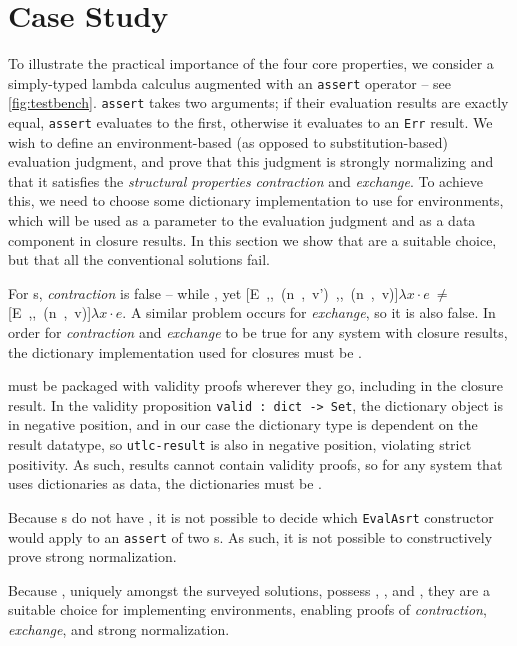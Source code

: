 \section{Case Study}
\label{sec:CaseStudy}



To illustrate the practical importance of the four core properties, we consider a simply-typed lambda calculus
augmented with an \texttt{assert} operator -- see \autoref{fig:testbench}.
\texttt{assert} takes two arguments; if their evaluation results are exactly equal, \texttt{assert} evaluates to the first,
otherwise it evaluates to an \texttt{Err} result. We wish to define an environment-based (as opposed to substitution-based)
evaluation judgment, and prove that this judgment is strongly normalizing and that it  satisfies the
\emph{structural properties} \emph{contraction} and \emph{exchange}. To achieve this,
we need to choose some dictionary implementation to use for environments,
which will be used as a parameter to the evaluation judgment and as a data component in closure results.
In this section we show that \dds{} are a suitable choice, but that all the conventional solutions fail.

For \sal{}s, \emph{contraction} is false --
while , yet
\hbox{[E ,, (n , v') ,, (n , v)]$\lambda x \cdot e$}$~\ne~$\hbox{[E ,, (n , v)]$\lambda x \cdot e$}.
A similar problem occurs for \emph{exchange}, so it is also false.
In order for \emph{contraction} and \emph{exchange} to be true for any system with closure results,
the dictionary implementation used for closures must be \extensional.

\Cals{} must be packaged with validity proofs wherever they go, including in the closure result.
In the validity proposition \texttt{valid : dict -> Set}, the dictionary object is in negative position,
and in our case the dictionary type is dependent on the result datatype,
so \texttt{utlc-result} is also in negative position, violating strict positivity.
As such, results cannot contain validity proofs, so for any system that uses dictionaries as data,
the dictionaries must be \total.

Because \fpf{}s do not have \EqDec, it is not possible to decide which \texttt{EvalAsrt} constructor would
apply to an \texttt{assert} of two \fpf{}s. As such, it is not possible to constructively prove strong normalization.

Because \dds, uniquely amongst the surveyed solutions, possess \SemTot, \SemInj, and \EqDec,
they are a suitable choice for implementing environments, enabling proofs of \emph{contraction},
\emph{exchange}, and strong normalization.

